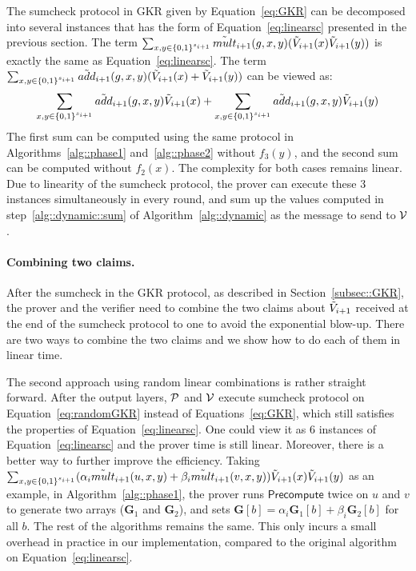 The sumcheck protocol in GKR given by Equation~\ref{eq:GKR} can be decomposed into several instances that has the form of Equation~\ref{eq:linearsc} presented in the previous section. The term $\sum_{x,y\in\binary^{s_{i+1}}}\tmult_{i+1}(g,x,y)(\tV_{i+1}(x)\tV_{i+1}(y))$ is exactly the same as Equation~\ref{eq:linearsc}.  The term $\sum_{x,y\in\binary^{s_{i+1}}}\tadd_{i+1}(g,x,y)(\tV_{i+1}(x)+\tV_{i+1}(y))$ can be viewed as: 
\[
\sum_{x,y\in\binary^{s_{i+1}}}\tadd_{i+1}(g,x,y)\tV_{i+1}(x)+\sum_{x,y\in\binary^{s_{i+1}}}\tadd_{i+1}(g,x,y)\tV_{i+1}(y)
\]
The first sum can be computed using the same protocol in Algorithms~\ref{alg::phase1} and~\ref{alg::phase2} without $f_3(y)$, and the second sum can be computed without $f_2(x)$. The complexity for both cases remains linear. Due to linearity of the sumcheck protocol, the prover can execute these 3 instances simultaneously in every round, and sum up the values computed in step~\ref{alg::dynamic::sum} of Algorithm~\ref{alg::dynamic} as the message to send to $\V$.



\paragraph{Combining two claims.} After the sumcheck in the GKR protocol, as described in Section~\ref{subsec::GKR}, the prover and the verifier need to combine the two claims about $\tV_{i+1}$ received at the end of the sumcheck protocol to one to avoid the exponential blow-up. There are two ways to combine the two claims and we show how to do each of them in linear time. 

The second approach using random linear combinations is rather straight forward. After the output layers, $\P$ and $\V$ execute sumcheck protocol on Equation~\ref{eq:randomGKR} instead of Equations~\ref{eq:GKR}, which still satisfies the properties of Equation~\ref{eq:linearsc}. One could view it as 6 instances of Equation~\ref{eq:linearsc} and the prover time is still linear. Moreover, there is a better way to further improve the efficiency. Taking $\sum_{x, y \in\binary^{s_{i+1}}}(\alpha_i\tmult_{i+1}(u,x,y)+\beta_i\tmult_{i+1}(v,x,y))\tV_{i+1}(x)\tV_{i+1}(y)$ as an example, in Algorithm~\ref{alg::phase1}, the prover runs $\mathsf{Precompute}$ twice on $u$ and $v$ to generate two arrays ($\textbf{G}_1$ and $\textbf{G}_2$), and sets $\textbf{G}[b]=\alpha_i \textbf{G}_1[b] + \beta_i\textbf{G}_2[b]$ for all $b$. The rest of the algorithms remains the same. This only incurs a small overhead in practice in our implementation, compared to the original algorithm on Equation~\ref{eq:linearsc}.


